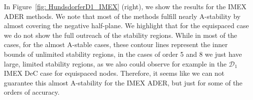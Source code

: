 In Figure~\ref{fig: HundsdorferD1_IMEX} (right), we show the results for the IMEX ADER methods. 
We note that most of the methods fulfill nearly A-stability by almost covering the negative half-plane. %
We highlight that for the equispaced case we do not show the full outreach of the stability regions. 
While in most of the cases, for the almost A-stable cases, these contour lines represent the inner bounds of unlimited stability regions, in the cases of order 5 and 8 we just have large, limited stability regions, as we also could observe for example in the $\mathcal{D}_1$ IMEX DeC case for equispaced nodes. 
Therefore, it seems like we can not guarantee this almost A-stability for the IMEX ADER, but just for some of the orders of accuracy.

